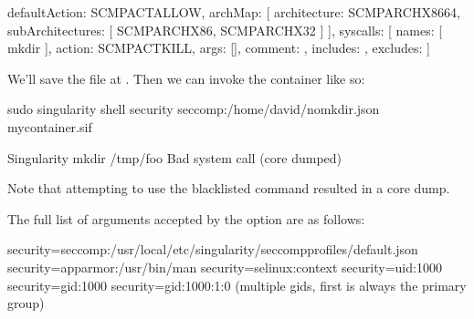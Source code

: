 \documentclass[letterpaper,10pt,english]{sphinxmanual}
\begin{document}
%
\begin{sphinxVerbatim}[commandchars=\\\{\}]
\PYGZob{}
    \PYGZdq{}defaultAction\PYGZdq{}: \PYGZdq{}SCMP\PYGZus{}ACT\PYGZus{}ALLOW\PYGZdq{},
    \PYGZdq{}archMap\PYGZdq{}: [
        \PYGZob{}
            \PYGZdq{}architecture\PYGZdq{}: \PYGZdq{}SCMP\PYGZus{}ARCH\PYGZus{}X86\PYGZus{}64\PYGZdq{},
            \PYGZdq{}subArchitectures\PYGZdq{}: [
                \PYGZdq{}SCMP\PYGZus{}ARCH\PYGZus{}X86\PYGZdq{},
                \PYGZdq{}SCMP\PYGZus{}ARCH\PYGZus{}X32\PYGZdq{}
            ]
        \PYGZcb{}
    ],
    \PYGZdq{}syscalls\PYGZdq{}: [
        \PYGZob{}
            \PYGZdq{}names\PYGZdq{}: [
                \PYGZdq{}mkdir\PYGZdq{}
            ],
            \PYGZdq{}action\PYGZdq{}: \PYGZdq{}SCMP\PYGZus{}ACT\PYGZus{}KILL\PYGZdq{},
            \PYGZdq{}args\PYGZdq{}: [],
            \PYGZdq{}comment\PYGZdq{}: \PYGZdq{}\PYGZdq{},
            \PYGZdq{}includes\PYGZdq{}: \PYGZob{}\PYGZcb{},
            \PYGZdq{}excludes\PYGZdq{}: \PYGZob{}\PYGZcb{}
        \PYGZcb{}
    ]
\PYGZcb{}
\end{sphinxVerbatim}

We’ll save the file at . Then we can invoke the
container like so:

%
\begin{sphinxVerbatim}[commandchars=\\\{\}]
\PYGZdl{} sudo singularity shell \PYGZhy{}\PYGZhy{}security seccomp:/home/david/no\PYGZus{}mkdir.json my\PYGZus{}container.sif

Singularity\PYGZgt{} mkdir /tmp/foo
Bad system call (core dumped)
\end{sphinxVerbatim}

Note that attempting to use the blacklisted  command resulted in a
core dump.

The full list of arguments accepted by the  option are as follows:

%
\begin{sphinxVerbatim}[commandchars=\\\{\}]
\PYGZhy{}\PYGZhy{}security=\PYGZdq{}seccomp:/usr/local/etc/singularity/seccomp\PYGZhy{}profiles/default.json\PYGZdq{}
\PYGZhy{}\PYGZhy{}security=\PYGZdq{}apparmor:/usr/bin/man\PYGZdq{}
\PYGZhy{}\PYGZhy{}security=\PYGZdq{}selinux:context\PYGZdq{}
\PYGZhy{}\PYGZhy{}security=\PYGZdq{}uid:1000\PYGZdq{}
\PYGZhy{}\PYGZhy{}security=\PYGZdq{}gid:1000\PYGZdq{}
\PYGZhy{}\PYGZhy{}security=\PYGZdq{}gid:1000:1:0\PYGZdq{} (multiple gids, first is always the primary group)
\end{sphinxVerbatim}



\renewcommand{\indexname}{Index}
\printindex
\end{document}
